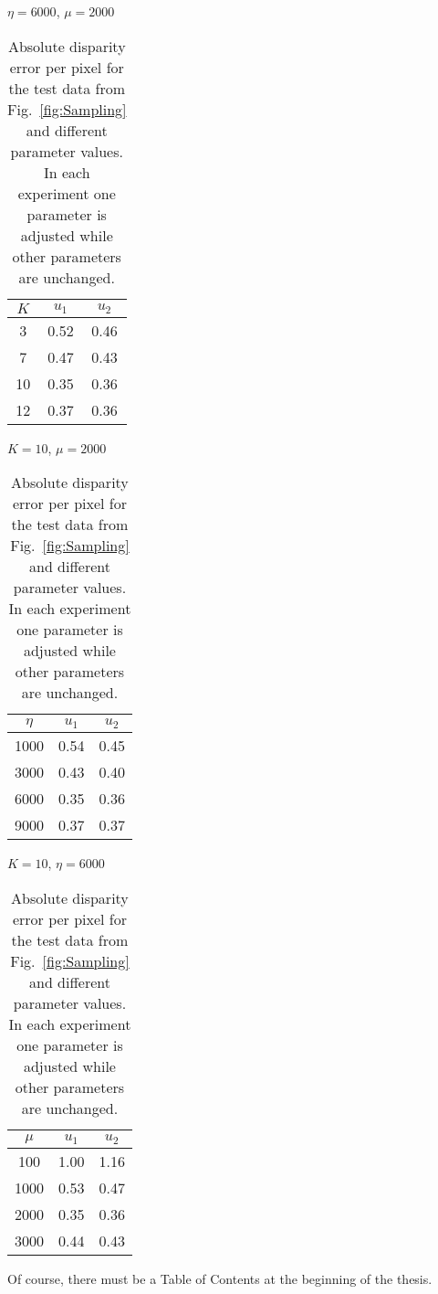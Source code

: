 \begin{table}[h]
	\caption{Absolute disparity error per pixel for the test data from
		Fig.~\ref{fig:Sampling} and different parameter values. In each experiment one
		parameter is adjusted while other parameters are unchanged.} 
	\centering
	\begin{minipage}[b]{0.30\linewidth}
		\centerline{$\eta=6000$, $\mu=2000$}\smallskip
		\centering
		\begin{tabular}{ccc}
			\hline
			$K$ & $u_1$ & $u_2$\\
			\hline
			3   & 0.52 &0.46\\
			7   & 0.47 &0.43\\
			10  & 0.35 &0.36\\
			12  & 0.37 &0.36\\
			\hline
		\end{tabular}
	\end{minipage}
	\begin{minipage}[b]{0.34\linewidth}
		\centerline{$K=10$, $\mu=2000$}\smallskip
		\centering
		\begin{tabular}{ccc}
			\hline
			$\eta$ & $u_1$ & $u_2$\\
			\hline
			1000&0.54& 0.45\\
			3000&0.43& 0.40\\
			6000&0.35& 0.36\\
			9000&0.37& 0.37\\
			\hline
		\end{tabular}
	\end{minipage}
	\begin{minipage}[b]{0.32\linewidth}
		\centerline{$K=10$, $\eta=6000$}\smallskip
		\centering
		\begin{tabular}{ccc}
			\hline
			$\mu$ & $u_1$ & $u_2$\\
			\hline
			100 &1.00&1.16\\
			1000&0.53&0.47\\
			2000&0.35&0.36\\
			3000&0.44&0.43\\
			\hline
		\end{tabular}
	\end{minipage}
	\label{tab:Parameters}
\end{table}

Of course, there must be a Table of Contents at the beginning of the thesis.
